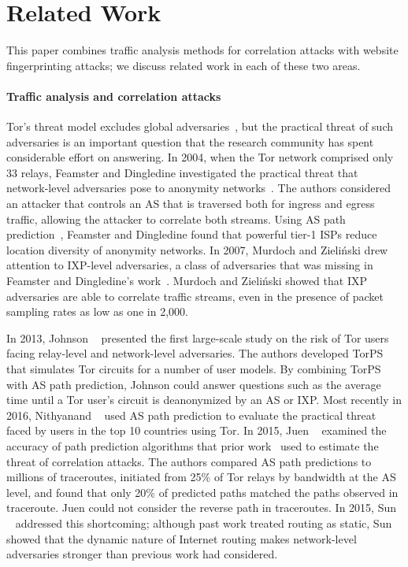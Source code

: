 \section{Related Work}
\label{sec:related_work}

This paper combines traffic analysis methods for correlation attacks
with website fingerprinting attacks; we discuss related work in each of
these two areas.

\paragraph{Traffic analysis and correlation attacks}
Tor's threat model excludes global adversaries~\cite{dingledine2004a}, but the
practical threat of such adversaries is an important question that the
research community has
spent considerable effort on answering.  In 2004, when the Tor network comprised
only 33 relays, Feamster and Dingledine investigated the practical threat that
network-level adversaries pose to anonymity networks~\cite{Feamster2004a}.
The authors considered an attacker that controls an AS
that is traversed both for ingress and egress traffic, allowing the
attacker to correlate both streams.  Using AS path prediction~\cite{Gao2001a},
Feamster and Dingledine found that powerful tier-1 ISPs reduce location
diversity of anonymity networks.  In 2007, Murdoch and Zieli\'{n}ski drew
attention to IXP-level adversaries, a class of adversaries that was missing in
Feamster and Dingledine's work~\cite{Murdoch2007a}.  Murdoch and Zieli\'{n}ski
showed that IXP adversaries are able to correlate traffic streams, even in the
presence of packet sampling rates as low as one in 2,000.

In 2013, Johnson
\ea~\cite{Johnson2013a} presented the first large-scale study on the risk of Tor
users facing relay-level and network-level adversaries.  The authors developed
TorPS~\cite{TorPS} that simulates Tor circuits for a number
of user models.  By combining TorPS with AS path
prediction, Johnson \ea could answer questions such as the average time until a
Tor user's circuit is deanonymized by an AS or IXP.  Most recently in 2016,
Nithyanand \ea~\cite{Nithyanand2016a} used AS path prediction to evaluate the
practical threat faced by users in the top 10 countries using Tor.  In 2015,
Juen \ea~\cite{Juen2015a} examined the accuracy of path prediction algorithms
that prior work~\cite{Johnson2013a,Feamster2004a} used to estimate the threat of
correlation attacks.  The authors compared AS path predictions to millions of
traceroutes, initiated from 25\% of Tor relays by bandwidth at the
AS level, and found that
only 20\% of predicted paths matched the paths observed in traceroute.
Juen \ea could not consider the reverse path in traceroutes.  In 2015,
Sun \ea~\cite{Sun2015a} addressed this shortcoming; although past work treated
routing as static, Sun \ea showed that the dynamic nature of Internet
routing makes network-level adversaries stronger than previous work had considered.

